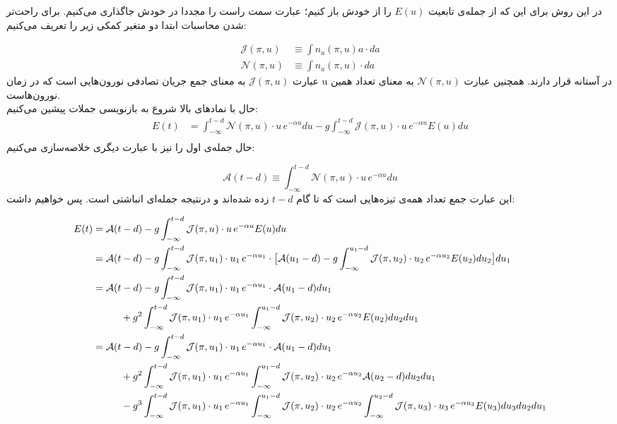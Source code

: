 \documentclass[12pt,onecolumn,a4paper]{article}
\begin{document}
در این روش برای این که از جمله‌ی تابعیت $E(u)$ را از خودش باز کنیم؛ عبارت سمت راست را مجددا در خودش جاگذاری می‌کنیم. برای راحت‌تر شدن محاسبات ابتدا دو متغیر کمکی زیر را تعریف می‌کنیم:
\newcommand{\J}[1]{\mathcal{J}(\pi,u_{#1})}
\newcommand{\N}[1]{\mathcal{N}(\pi,u_{#1})}

\newcommand{\A}[1]{\mathcal{A}(#1 - d)}

\newcommand{\impact}[1]{u_{#1}\, e^{-\alpha u_{#1}}}
%
\begin{align}
\J{} &\equiv \int n_a(\pi,u) a \cdot da\\
\N{} &\equiv \int n_a(\pi,u) \cdot da
\end{align}
عبارت $\J{}$ به معنای جمع جریان تصادفی نورون‌هایی است که در زمان u در آستانه قرار دارند. همچنین عبارت $\N{}$ به معنای تعداد همین نورون‌هاست.\\
حال با نمادهای بالا شروع به بازنویسی جملات پیشین می‌کنیم:
\begin{align}
E(t) &= \int_{- \infty}^{t - d} \N{} \cdot u\, e^{-\alpha u} du  - g\int_{- \infty}^{t - d} \J{} \cdot u\, e^{-\alpha u} E(u)  du\\
\end{align}
حال جمله‌ی اول را نیز با عبارت دیگری خلاصه‌سازی می‌کنیم:

\begin{equation}
\A{t} \equiv \int_{- \infty}^{t - d} \N{} \cdot u\, e^{-\alpha u} du 
\end{equation}
این عبارت جمع تعداد همه‌ی تیزه‌هایی است که تا گام $t-d$ زده شده‌اند و درنتیجه جمله‌ای انباشتی است. پس خواهیم داشت:
\begin{changemargin}{-3cm}{-3cm} 
\begin{align}
E(t) &= \A{t} - g\int_{- \infty}^{t - d} \J{} \cdot u\, e^{-\alpha u}E(u) du\\
&= \A{t} - g\int_{- \infty}^{t - d} \J{1} \cdot \impact{1} \cdot \big[ \A{u_1} - g\int_{- \infty}^{u_1 - d} \J{2} \cdot \impact{2} E(u_2) du_2 \big] du_1\\
&= \A{t} - g\int_{- \infty}^{t - d} \J{1} \cdot \impact{1} \cdot \A{u_1} du_1\\ 
&\hspace{1 cm}+ g^2 \int_{- \infty}^{t - d} \J{1} \cdot \impact{1}\int_{- \infty}^{u_1 - d} \J{2} \cdot \impact{2} E(u_2) du_2 du_1\\
&= \A{t} - g\int_{- \infty}^{t - d} \J{1} \cdot \impact{1} \cdot \A{u_1} du_1\\ 
&\hspace{1 cm}+ g^2 \int_{- \infty}^{t - d} \J{1} \cdot \impact{1}\int_{- \infty}^{u_1 - d} \J{2} \cdot \impact{2} \A{u_2} du_2 du_1\\
&\hspace{1 cm}- g^3 \int_{- \infty}^{t - d} \J{1} \cdot \impact{1}\int_{- \infty}^{u_1 - d} \J{2} \cdot \impact{2} \int_{- \infty}^{u_2 - d} \J{3} \cdot \impact{3} E(u_3) du_3 du_2 du_1
\end{align}

\end{changemargin}
\end{document}
